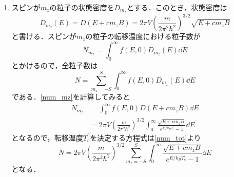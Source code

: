 \documentclass[a4paper,pdflatex,ja=standard]{bxjsarticle}
\begin{document}
\begin{enumerate}
  \item 
  スピンが$m_z$の粒子の状態密度を$D_{m_z}$とする．このとき，状態密度は
  \begin{equation}
    D_{m_z}(E)
    =
    D(E+cm_{z}B)
    =
    2\pi V
    \left(  
      \frac{m}{2\pi^2\hbar^2}
    \right)^{3/2}
    \sqrt{E+cm_{z}B}
  \end{equation}
  と書ける．スピンが$m_z$の粒子の転移温度における粒子数が
  \begin{equation}
    N_{m_{z}}
    =
    \int_{0}^{\infty}f(E,0)D_{m_z}(E)\dd E
    \label{num_mz}
  \end{equation}
  とかけるので，全粒子数は
  \begin{equation}
    N
    =
    \sum_{m_z=-S}^{S}\int_{0}^{\infty}f(E,0)D_{m_z}(E)\dd E
    \label{num_tot}
  \end{equation}
  である．\eqref{num_mz}を計算してみると
  \begin{align}
    N_{m_{z}}
    &=
    \int_{0}^{\infty}f(E,0)D(E+cm_{z}B)\dd E
    \nonumber
    \\
    &=
    2\pi V
    \left(  
      \frac{m}{2\pi^2\hbar^2}
    \right)^{3/2}
    \int_{0}^{\infty}
    \frac{\sqrt{E+cm_{z}B}}{e^{E/k_{B}T_{c}^{\prime}}-1}    
    \dd E
  \end{align}
  となるので，転移温度$T_{c}^{\prime}$を決定する方程式は\eqref{num_tot}より
  \begin{equation}
    N
    =
    2\pi V
    \left(  
      \frac{m}{2\pi^2\hbar^2}
    \right)^{3/2}
    \sum_{m_z=-S}^{S}
    \int_{0}^{\infty}
    \frac{\sqrt{E+cm_{z}B}}{e^{E/k_{B}T_{c}^{\prime}}-1}    
    \dd E
    \label{num_tot2}
  \end{equation}
  となる．
  

\end{enumerate}
\end{document}
